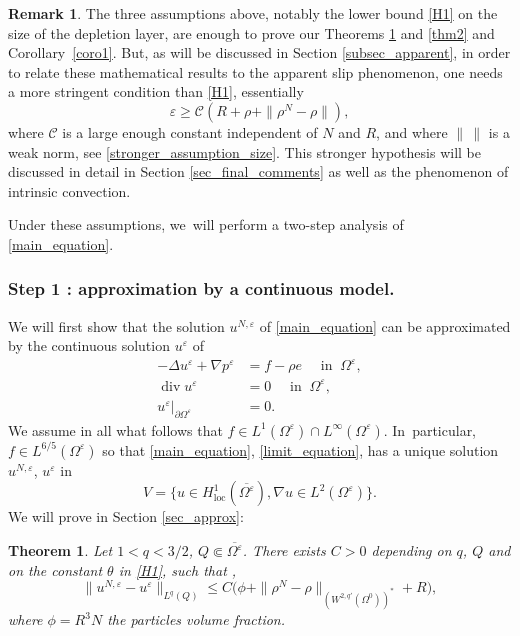 \documentclass[10pt]{amsart}
\let\epsilon\varepsilon
\newcommand{\loc}{\mathrm{loc}}
\renewcommand{\div}{\operatorname{div}}
\theoremstyle{plain}
\newtheorem{thm}{Theorem}[section]
\theoremstyle{definition}
\newtheorem{rem}{Remark}[section]
\let\pa\partial
\let\na\nabla
\let\eps\varepsilon
\begin{document}
\begin{rem}
The three assumptions above, notably the lower bound \eqref{H1} on the size of the depletion layer, are enough to prove our Theorems \ref{thm1} and \ref{thm2} and Corollary~\ref{coro1}. But, as will be discussed in Section \ref{subsec_apparent}, in order to relate these mathematical results to the apparent slip phenomenon, one needs a more stringent condition than \eqref{H1}, essentially
\[
\epsilon \ge \mathcal{C} (R+ \rho+ \|\rho^N-\rho\|),
\]
where $\mathcal{C}$ is a large enough constant independent of $N$ and $R$, and where $\| \, \|$ is a weak norm, see \eqref{stronger_assumption_size}. This stronger hypothesis will be discussed in detail in Section \ref{sec_final_comments} as well as the phenomenon of intrinsic convection.
\end{rem}
Under these assumptions, we~will perform a two-step analysis of \eqref{main_equation}.
\subsubsection*{Step 1 : approximation by a continuous model.}
We will first show that the solution $u^{N,\eps}$ of \eqref{main_equation} can be approximated by the continuous solution $u^\eps$ of
\begin{equation} \label{limit_equation}
\begin{aligned}
-\Delta u^\eps + \na p^\eps & = f - \rho e \quad \text{ in } \: \Omega^\eps, \\
\div u^\eps & = 0 \quad \text{ in } \: \Omega^\eps, \\
u^\eps \vert_{\pa \Omega^\eps} & = 0.
\end{aligned}
\end{equation}
We assume in all what follows that $f \in L^1(\Omega^\eps) \cap L^\infty(\Omega^\eps)$. In~particular, $f \in L^{6/5}(\Omega^\eps)$ so that \eqref{main_equation}, \resp \eqref{limit_equation}, has a unique solution $u^{N,\eps}$, \resp $u^\eps$ in
\[
V = \{ u \in H^1_{\loc}(\overline{\Omega^\eps}), \na u \in L^2(\Omega^\eps)\}.
\]
We will prove in Section \ref{sec_approx}:

\begin{thm} \label{thm1}
Let $1<q<3/2$, $Q \Subset \overline{\Omega^\eps}$. There exists $C > 0$ depending on $q$, $Q$ and on the constant $\theta$ in \eqref{H1}, such that ,
\begin{equation} \label{first_estimate}
\|u^{N,\eps} - u^\eps\|_{L^q(Q)} \le C \big(\phi + \|\rho^N-\rho\|_{(W^{2,q'}(\Omega^0))^*}+R \big),
\end{equation}
where $\phi=R^3N$ the particles volume fraction.
\end{thm}
\end{document}
